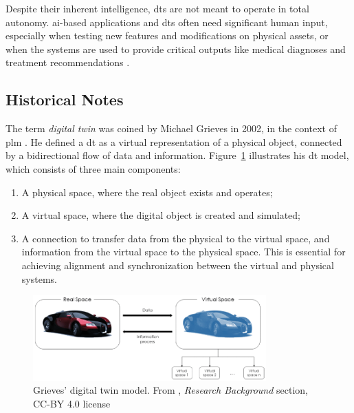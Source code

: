 Despite their inherent intelligence, \acrshort{dt}s are not meant to operate in total autonomy. \acrshort{ai}-based applications and \acrshort{dt}s often need significant human input, especially when testing new features and modifications on physical assets, or when the systems are used to provide critical outputs like medical diagnoses and treatment recommendations \parencite{barricelliSurveyDigitalTwin2019}.

\subsection{Historical Notes}

The term \textit{digital twin} was coined by Michael Grieves in 2002, in the context of \acrfull{plm} \parencite{grievesDigitalTwinManufacturing2014,grievesDigitalTwinMitigating2017}. He defined a \acrshort{dt} as a virtual representation of a physical object, connected by a bidirectional flow of data and information. Figure~\ref{fig:grieves_digital_twin} illustrates his \acrshort{dt} model, which consists of three main components:
\begin{enumerate}
    \item A physical space, where the real object exists and operates;
    \item A virtual space, where the digital object is created and simulated;
    \item A connection to transfer data from the physical to the virtual space, and information from the virtual space to the physical space. This is essential for achieving alignment and synchronization between the virtual and physical systems.
\end{enumerate}

\begin{figure}
    \centering
    \includegraphics[width=0.8\textwidth]{images/digital_twins/dt_model_grieves.png}
    \caption[Grieves' digital twin model]{Grieves' digital twin model. From \textcite{barricelliSurveyDigitalTwin2019}, \textit{Research Background} section, CC-BY 4.0 license}
    \label{fig:grieves_digital_twin}
\end{figure}

